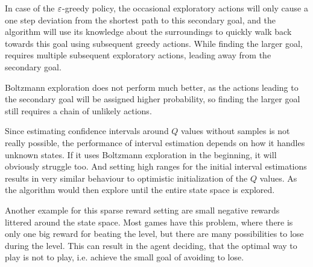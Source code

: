 \begin{wrapfigure}{r}{5.5cm}
	\begin{center}
	\end{center}
\end{wrapfigure}

In case of the \(\varepsilon\)-greedy policy, the occasional exploratory actions will only cause a one step deviation from the shortest path to this secondary goal, and the algorithm will use its knowledge about the surroundings to quickly walk back towards this goal using subsequent greedy actions. While finding the larger goal, requires multiple subsequent exploratory actions, leading away from the secondary goal. 

Boltzmann exploration does not perform much better, as the actions leading to the secondary goal will be assigned higher probability, so finding the larger goal still requires a chain of unlikely actions. 

Since estimating confidence intervals around \(Q\) values without samples is not really possible, the performance of interval estimation depends on how it handles unknown states. If it uses Boltzmann exploration in the beginning, it will obviously struggle too. And setting high ranges for the initial interval estimations results in very similar behaviour to optimistic initialization of the \(Q\) values. As the algorithm would then explore until the entire state space is explored. 

Another example for this sparse reward setting are small negative rewards littered around the state space. Most games have this problem, where there is only one big reward for beating the level, but there are many possibilities to lose during the level. This can result in the agent deciding, that the optimal way to play is not to play, i.e. achieve the small goal of avoiding to lose.  

